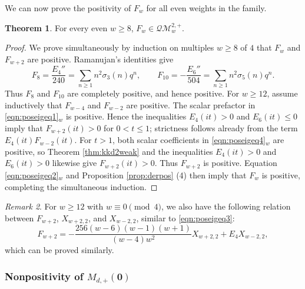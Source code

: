 \documentclass[10pt,reqno]{amsproc}
\newcommand{\QM}{\mathcal{QM}}
\newcommand{\1}{\mathds{1}}	%
\theoremstyle{definition}
\newtheorem{theorem}{Theorem}[section]
\theoremstyle{remark}
\newtheorem{remark}[theorem]{Remark}
\begin{document}
We can now prove the positivity of $F_w$ for all even weights in the family.

\begin{theorem}
\label{thm:poseigpos}
For every even $w\geq 8$, $F_w \in \QM_{w}^{2, +}$.
\end{theorem}
\begin{proof}
We prove simultaneously by induction on multiples $w \geq 8$ of $4$ that $F_w$ and $F_{w+2}$ are positive.
Ramanujan's identities give
\[
    F_8 = \frac{E_4''}{240} = \sum_{n \ge 1} n^2 \sigma_3(n) q^n,
    \qquad
    F_{10} = -\frac{E_6''}{504} = \sum_{n \ge 1} n^2 \sigma_5(n) q^n.
\]
Thus $F_8$ and $F_{10}$ are completely positive, and hence positive.
For $w \geq 12$, assume inductively that $F_{w-4}$ and $F_{w-2}$ are positive.
The scalar prefactor in \eqref{eqn:poseigeq1}${}_{w}$ is positive. Hence the inequalities $E_4(it) > 0$ and $E_6(it) \leq 0$ imply that $F_{w+2}(it) > 0$ for $0 < t \leq 1$; strictness follows already from the term $E_4(it)F_{w-2}(it)$.
For $t>1$, both scalar coefficients in \eqref{eqn:poseigeq4}${}_{w}$ are positive, so Theorem \ref{thm:kkd2weak} and the inequalities $E_4(it)>0$ and $E_6(it)>0$ likewise give $F_{w+2}(it)>0$.
Thus $F_{w+2}$ is positive. Equation \eqref{eqn:poseigeq2}${}_{w}$ and Proposition \ref{prop:derpos} (4) then imply that $F_w$ is positive, completing the simultaneous induction.
\end{proof}

\begin{remark}
For $w\geq12$ with $w\equiv 0\pmod{4}$, we also have the following relation between $F_{w+2}$, $X_{w+2, 2}$, and $X_{w-2, 2}$, similar to \eqref{eqn:poseigeq3}:
\begin{equation}
\label{eqn:poseigeq5}
F_{w+2} = -\frac{256(w-6)(w-1)(w+1)}{(w-4)w^2} X_{w+2, 2} + E_4 X_{w-2, 2},
\end{equation}
which can be proved similarly.
\end{remark}


\subsubsection{Nonpositivity of $M_{d,+}(\mathbf{0})$}
\label{subsec:nonposorig_pos}
\end{document}

